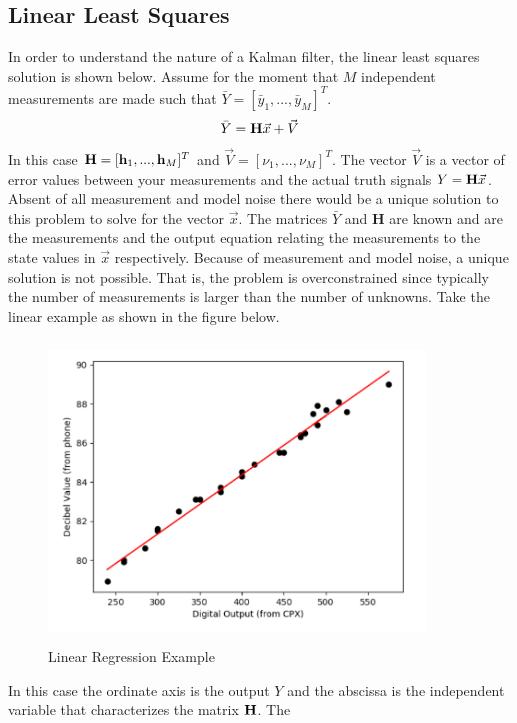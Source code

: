 \subsection{Linear Least Squares}

In order to understand the nature of a Kalman filter, the linear least
squares solution is shown below. Assume for the moment that $M$
independent measurements are made such that $\bar{Y} = [\bar{y}_1,...,\bar{y}_M]^T$.
\begin{equation}
  \bar{Y} = {\bf H}\vec{x} + \vec{V}
\end{equation}
In this case ${\bf H} = [{\bf h}_1,...,{\bf h}_M]^T$ and $\vec{V} = [\nu_1,...,\nu_M]^T$. 
The vector $\vec{V}$ is a vector of error values between your
measurements and the actual truth signals $Y = {\bf H}\vec{x}$. Absent
of all measurement and model noise there 
would be a unique solution to this problem to solve for the vector
$\vec{x}$. The matrices $\bar{Y}$ and {\bf H} are
known and are the measurements and the output equation relating the
measurements to the state values in $\vec{x}$ respectively. Because of
measurement and model noise, a unique solution is not possible. That
is, the problem is overconstrained since typically the number of measurements is larger
than the number of unknowns. Take the linear example as shown in the
figure below.
\begin{figure}[H]
  \begin{center}
  \includegraphics[height=80mm, width=100mm]{Figures/Linear_Regression.png}
  \end{center}
  \caption{Linear Regression Example}\label{f:linear_regression}
\end{figure}
In this case the ordinate axis is the output $Y$ and the abscissa is
the independent variable that characterizes the matrix ${\bf H}$. The
